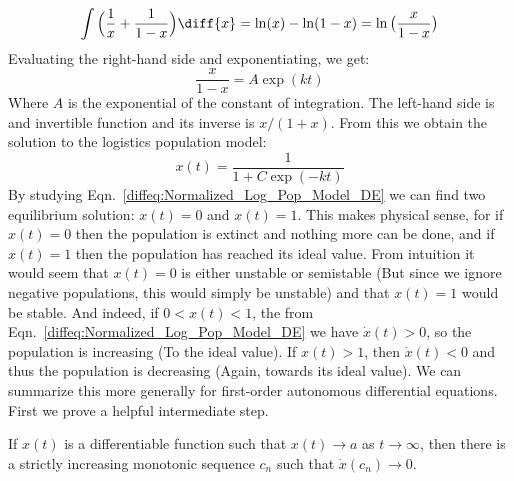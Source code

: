                 \begin{equation}
                    \int\Big(\frac{1}{x}+\frac{1}{1-x}\Big)\diff{x}
                    =\ln(x)-\ln(1-x)
                    =\ln\big(\frac{x}{1-x}\big)
                \end{equation}
                Evaluating the right-hand side and exponentiating,
                we get:
                \begin{equation}
                    \frac{x}{1-x}=A\exp(kt)
                \end{equation}
                Where $A$ is the exponential of the constant of
                integration. The left-hand side is and invertible
                function and its inverse is $x/(1+x)$. From this we
                obtain the solution to the logistics population model:
                \begin{equation}
                    x(t)=\frac{1}{1+C\exp(-kt)}
                \end{equation}
                By studying Eqn.~\ref{diffeq:Normalized_Log_Pop_Model_DE}
                we can find two equilibrium solution: $x(t)=0$ and
                $x(t)=1$. This makes physical sense, for if $x(t)=0$
                then the population is extinct and nothing more can be
                done, and if $x(t)=1$ then the population has reached its
                ideal value. From intuition it would seem that $x(t)=0$
                is either unstable or semistable (But since we ignore
                negative populations, this would simply be unstable) and
                that $x(t)=1$ would be stable. And indeed, if
                $0<x(t)<1$, the from
                Eqn.~\ref{diffeq:Normalized_Log_Pop_Model_DE} we have
                $\dot{x}(t)>0$, so the population is increasing
                (To the ideal value). If $x(t)>1$, then $\dot{x}(t)<0$
                and thus the population is decreasing
                (Again, towards its ideal value). We can summarize this
                more generally for first-order autonomous differential
                equations. First we prove a helpful intermediate step.
                \begin{theorem}
                    If $x(t)$ is a differentiable function such that
                    $x(t)\rightarrow{a}$ as $t\rightarrow\infty$, then
                    there is a strictly increasing monotonic sequence
                    $c_{n}$ such that $\dot{x}(c_{n})\rightarrow{0}$.
                \end{theorem}
